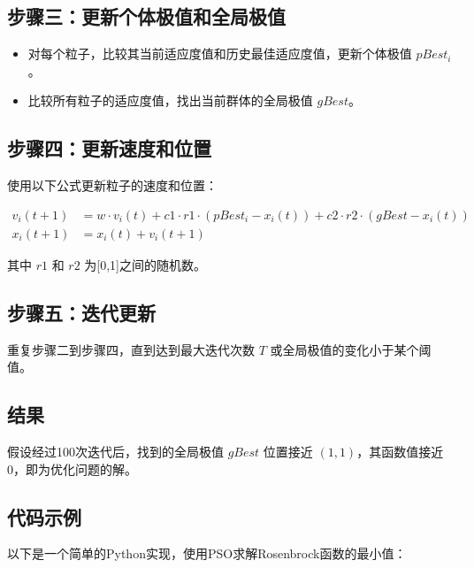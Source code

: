\documentclass{article}
\begin{document}
\subsection{步骤三：更新个体极值和全局极值}
\begin{itemize}
  \item 对每个粒子，比较其当前适应度值和历史最佳适应度值，更新个体极值 $pBest_i$。
  \item 比较所有粒子的适应度值，找出当前群体的全局极值 $gBest$。
\end{itemize}

\subsection{步骤四：更新速度和位置}
使用以下公式更新粒子的速度和位置：

\begin{align}
v_{i}(t+1) &= w \cdot v_{i}(t) + c1 \cdot r1 \cdot (pBest_{i} - x_{i}(t)) + c2 \cdot r2 \cdot (gBest - x_{i}(t)) \\
x_{i}(t+1) &= x_{i}(t) + v_{i}(t+1)
\end{align}

其中 $r1$ 和 $r2$ 为[0,1]之间的随机数。

\subsection{步骤五：迭代更新}
重复步骤二到步骤四，直到达到最大迭代次数 $T$ 或全局极值的变化小于某个阈值。

\subsection{结果}
假设经过100次迭代后，找到的全局极值 $gBest$ 位置接近 $(1, 1)$，其函数值接近0，即为优化问题的解。

\subsection{代码示例}
以下是一个简单的Python实现，使用PSO求解Rosenbrock函数的最小值：
\end{document}
